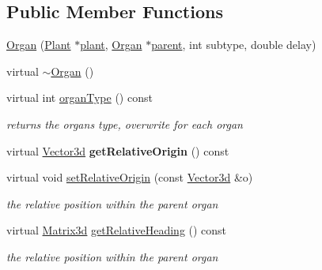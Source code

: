 \subsection*{Public Member Functions}
\begin{DoxyCompactItemize}
\item 
\hyperlink{classCPlantBox_1_1Organ_a7cc5635a2b9a20facab79a78e7a4eb48}{Organ} (\hyperlink{classCPlantBox_1_1Plant}{Plant} $\ast$\hyperlink{classCPlantBox_1_1Organ_ac614456886ab270c6fd2617403e0f306}{plant}, \hyperlink{classCPlantBox_1_1Organ}{Organ} $\ast$\hyperlink{classCPlantBox_1_1Organ_a8ad90078d5ef859bd2ab71700854e286}{parent}, int subtype, double delay)
\item 
virtual \hyperlink{classCPlantBox_1_1Organ_a0c6757c6789c3508696ce3253f81aaa3}{$\sim$\+Organ} ()
\item 
\mbox{\label{classCPlantBox_1_1Organ_abb608537d6c6d8888407eacdadca5518}} 
virtual int \hyperlink{classCPlantBox_1_1Organ_abb608537d6c6d8888407eacdadca5518}{organ\+Type} () const
\begin{DoxyCompactList}\small\item\em returns the organs type, overwrite for each organ \end{DoxyCompactList}\item 
\mbox{\label{classCPlantBox_1_1Organ_a9046ebc480f02addf40388aebae7ecc1}} 
virtual \hyperlink{classCPlantBox_1_1Vector3d}{Vector3d} {\bfseries get\+Relative\+Origin} () const
\item 
\mbox{\label{classCPlantBox_1_1Organ_a7c2299c7e83d9da1591d63bc5c7d2b17}} 
virtual void \hyperlink{classCPlantBox_1_1Organ_a7c2299c7e83d9da1591d63bc5c7d2b17}{set\+Relative\+Origin} (const \hyperlink{classCPlantBox_1_1Vector3d}{Vector3d} \&o)
\begin{DoxyCompactList}\small\item\em the relative position within the parent organ \end{DoxyCompactList}\item 
\mbox{\label{classCPlantBox_1_1Organ_aa2a305a167faaca52f01f19eb894143f}} 
virtual \hyperlink{classCPlantBox_1_1Matrix3d}{Matrix3d} \hyperlink{classCPlantBox_1_1Organ_aa2a305a167faaca52f01f19eb894143f}{get\+Relative\+Heading} () const
\begin{DoxyCompactList}\small\item\em the relative position within the parent organ \end{DoxyCompactList}\item 

\end{DoxyCompactItemize}
